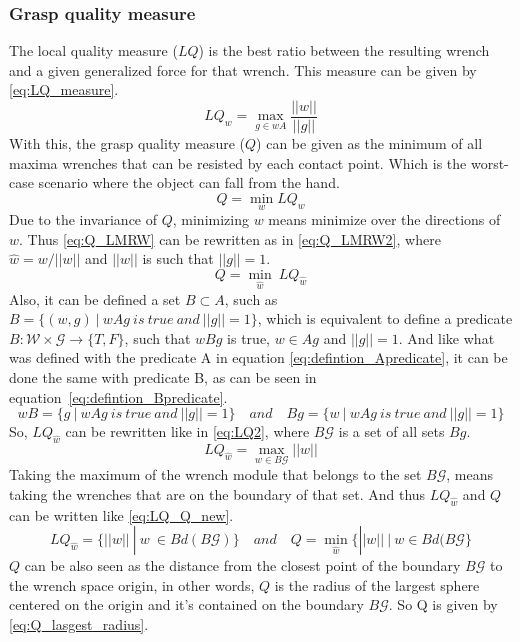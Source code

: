 \subsubsection{Grasp quality measure}
The local quality measure ($LQ$) is the best ratio between the resulting wrench and a given generalized force for that wrench. This measure can be given by \eqref{eq:LQ_measure}.
\begin{equation}\label{eq:LQ_measure}
        LQ_w=   \max_{g \in wA}\frac{||w||}{||g||}
\end{equation}
With this, the grasp quality measure ($Q$) can be given as the minimum of all maxima wrenches that can be resisted by each contact point. Which is the worst-case scenario where the object can fall from the hand.
\begin{equation}\label{eq:Q_LMRW}
    Q= \min_w LQ_w
\end{equation}
Due to the invariance of $Q$, minimizing $w$ means minimize over the directions of $w$. Thus \eqref{eq:Q_LMRW} can be rewritten as in \eqref{eq:Q_LMRW2}, where $\hat{w} = w/||w||$ and $||w||$ is such that $||g||= 1 $.
\begin{equation}\label{eq:Q_LMRW2}
    Q=\min_{\hat{w}}\ LQ_{\hat{w}}
\end{equation}
Also, it can be defined a set $B \subset A$, such as $B = \{ (w,g)\ |\ wAg\ is\ true\ and\ ||g||=1 \}$,  which is equivalent to define a predicate $B:\mathcal{W} \times \mathcal{G} \rightarrow \{ T, F \}$, such that $wBg$ is true, $w \in Ag$ and $||g|| = 1$.
And like what was defined with the predicate A in equation \eqref{eq:defintion_Apredicate}, it can be done the same with predicate B, as can be seen in equation~\eqref{eq:defintion_Bpredicate}.
\begin{equation}\label{eq:defintion_Bpredicate}
    wB= \Big\{g\ |\ wAg\ is\ true\ and\ ||g||=1 \Big\} \quad and   \quad  Bg= \Big\{w\ |\ wAg\ is\ true\ and\ ||g||=1 \Big\}
\end{equation}
So, $LQ_{\hat{w}}$ can be rewritten like in \eqref{eq:LQ2}, where $B\mathcal{G}$ is a set of all sets $Bg$.
\begin{equation}\label{eq:LQ2}
    LQ_{\hat{w}}= \max_{w \in B \mathcal{G}} ||w||
\end{equation}
Taking the maximum of the wrench module that belongs to the set $B\mathcal{G}$,  means taking the wrenches that are on the boundary of  that set. And thus $LQ_{\hat{w}}$ and $Q$ can be written like \eqref{eq:LQ_Q_new}.
\begin{equation}\label{eq:LQ_Q_new}
    LQ_{\hat{w}} = \Big\{   ||w||\ |\ w\ \in Bd(B\mathcal{G}) \Big\} \quad and \quad Q = \min_{\hat{w}} \Big\{ ||w||\ |\ w \in Bd(B\mathcal{G} \Big\}
\end{equation}
$Q$ can  be also seen as the distance from the closest point of the boundary $B\mathcal{G}$ to the wrench space origin, in other words, $Q$ is the radius of the largest sphere centered on the origin and it's contained on the boundary $B\mathcal{G}$. So Q is given by \eqref{eq:Q_lasgest_radius}.

